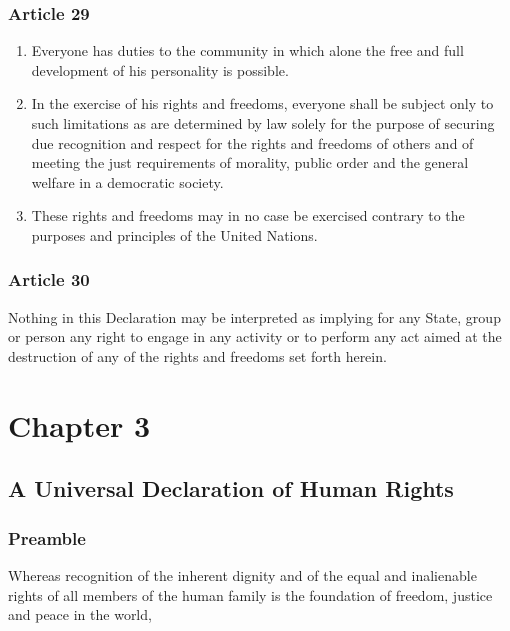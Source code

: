 \documentclass[
  titlepage,
  openright,
  DIV=calc,
  toc=listof,
  listof=nochaptergap]{scrbook}
\begin{document}
\subsection{Article 29}\label{article-29}

\begin{enumerate}
\def\labelenumi{\arabic{enumi}.}
\item
  Everyone has duties to the community in which alone the free and full
  development of his personality is possible.
\item
  In the exercise of his rights and freedoms, everyone shall be subject
  only to such limitations as are determined by law solely for the
  purpose of securing due recognition and respect for the rights and
  freedoms of others and of meeting the just requirements of morality,
  public order and the general welfare in a democratic society.
\item
  These rights and freedoms may in no case be exercised contrary to the
  purposes and principles of the United Nations.
\end{enumerate}

\subsection{Article 30}\label{article-30}

Nothing in this Declaration may be interpreted as implying for any
State, group or person any right to engage in any activity or to perform
any act aimed at the destruction of any of the rights and freedoms set
forth herein.

\chapter{Chapter 3}\label{sec:chapter3}

\section{A Universal Declaration of Human
Rights}\label{a-universal-declaration-of-human-rights-1}

\subsection{Preamble}\label{preamble-1}

Whereas recognition of the inherent dignity and of the equal and
inalienable rights of all members of the human family is the foundation
of freedom, justice and peace in the world,
\end{document}
